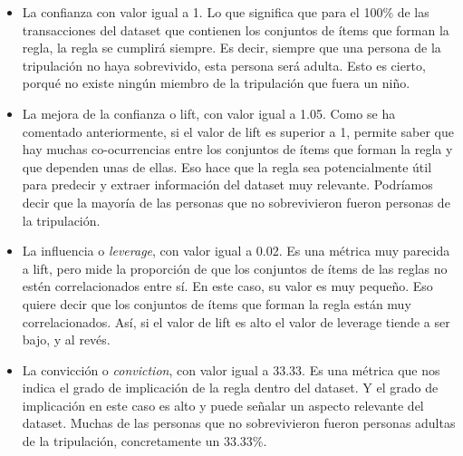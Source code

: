 \documentclass[11pt]{exam}
\begin{document}
\begin{questions}
\begin{itemize}
	\item La confianza con valor igual a 1. Lo que significa que para el 100\% de las transacciones del dataset que contienen los conjuntos de ítems que forman la regla, la regla se cumplirá siempre. Es decir, siempre que una persona de la tripulación no haya sobrevivido, esta persona será adulta. Esto es cierto, porqué no existe ningún miembro de la tripulación que fuera un niño.
	\item La mejora de la confianza o lift, con valor igual a 1.05. Como se ha comentado anteriormente, si el valor de lift es superior a 1, permite saber que hay muchas co-ocurrencias entre los conjuntos de ítems que forman la regla y que dependen unas de ellas. Eso hace que la regla sea potencialmente útil para predecir y extraer información del dataset muy relevante. Podríamos decir que la mayoría de las personas que no sobrevivieron fueron personas de la tripulación.
	\item La influencia o \textit{leverage}, con valor igual a 0.02. Es una métrica muy parecida a lift, pero mide la proporción de que los conjuntos de ítems de las reglas no estén correlacionados entre sí. En este caso, su valor es muy pequeño. Eso quiere decir que los conjuntos de ítems que forman la regla están muy correlacionados. Así, si el valor de lift es alto el valor de leverage tiende a ser bajo, y al revés.
	\item La convicción o \textit{conviction}, con valor igual a 33.33. Es una métrica que nos indica el grado de implicación de la regla dentro del dataset. Y el grado de implicación en este caso es alto y puede señalar un aspecto relevante del dataset. Muchas de las personas que no sobrevivieron fueron personas adultas de la tripulación, concretamente un 33.33\%.
\end{itemize}

\end{questions}
\end{document}
